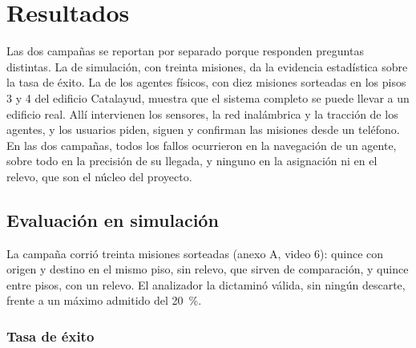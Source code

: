 %
\chapter{Resultados}
\label{cap:resultados}

Las dos campañas se reportan por separado porque responden preguntas distintas. La de simulación, con treinta misiones, da la evidencia estadística sobre la tasa de éxito. La de los agentes físicos, con diez misiones sorteadas en los pisos 3 y 4 del edificio Catalayud, muestra que el sistema completo se puede llevar a un edificio real. Allí intervienen los sensores, la red inalámbrica y la tracción de los agentes, y los usuarios piden, siguen y confirman las misiones desde un teléfono. En las dos campañas, todos los fallos ocurrieron en la navegación de un agente, sobre todo en la precisión de su llegada, y ninguno en la asignación ni en el relevo, que son el núcleo del proyecto.

\section{Evaluación en simulación}
\label{sec:res-sim}

La campaña corrió treinta misiones sorteadas (anexo A, video 6): quince con origen y destino en el mismo piso, sin relevo, que sirven de comparación, y quince entre pisos, con un relevo. El analizador la
dictaminó válida, sin ningún descarte, frente a un máximo admitido del 20~\%.

\subsection{Tasa de éxito}

